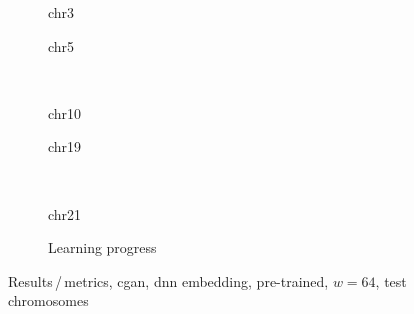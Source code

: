 \begin{figure}[p] %
    \begin{subfigure}{0.45\textwidth}
        \scriptsize
        \caption{chr3}
    \end{subfigure} \hfill
    \begin{subfigure}{0.45\textwidth}
        \scriptsize
        \caption{chr5}
    \end{subfigure}\\[5mm]
    \begin{subfigure}{0.45\textwidth}
        \scriptsize
        \caption{chr10}
    \end{subfigure}\hfill
    \begin{subfigure}{0.45\textwidth}
        \scriptsize
        \caption{chr19}
    \end{subfigure}\\[3mm]
    \begin{subfigure}{0.45\textwidth}
        \scriptsize
        \caption{chr21}
    \end{subfigure} \hfill
    \begin{subfigure}{0.45\textwidth}
        \scriptsize
        \caption{Learning progress} \label{fig:results:GAN64_pretrain-dnn_lossEpochs}
    \end{subfigure}
    \caption{Results\,/\,metrics, \acrshort{cgan}, \acrshort{dnn} embedding, pre-trained, $w=64$, test chromosomes}   \label{fig:results:GAN64_pretrain-dnn_pearson}
\end{figure}
